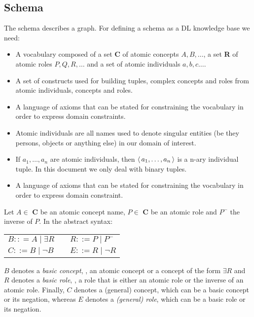\subsection{Schema}

The schema describes a graph. For defining a schema as a DL knowledge base we need:

\begin{itemize}
\item  A vocabulary composed of a set  \textbf{C} of atomic concepts $A, B, \dots$,
a set \textbf{R} of atomic roles $P, Q, R, \dots$ and a set of atomic individuals $a, b, c \dots$.


\item A set of constructs  used for building  tuples, complex concepts and roles  from atomic individuals, concepts and roles.
\item A language of axioms that can be stated for constraining  the vocabulary  in order to express domain constraints.

\item Atomic individuals are all names used to denote
singular entities (be they persons, objects or anything else) in our
domain of interest. 

\item If $a_1, \dots, a_n$ are atomic individuals, then $\tuple{a_1, \dots, a_n} $ is a n-ary individual tuple. In this document we only deal with binary tuples.

\item A language of axioms 
that can be stated for constraining the vocabulary in order to
express domain constraint.

\end{itemize}



\begin{definition} 
Let $A \in$   \textbf{C} be an atomic concept name, 
$P \in $ \textbf{C} be an atomic role and $P^-$ the inverse of  $P$.
In  the abstract syntax:

\begin{center}
\begin{tabular}{lcl}
$ B :: =  A \mid \exists R$ 	&\hspace{1cm}		&$ R ::= P \mid P^-$\\
$C ::= B \mid \neg B$ 		& 							&$ E ::= R \mid \neg R$ \\
\end{tabular}
\end{center}

\noindent
 $B$ denotes a \textit{basic concept}, \ie,  an atomic concept or a concept of 
 the form $\exists R$ and $R$ denotes a \textit{basic role}, \ie, a role that is either an 
 atomic role or the inverse of an atomic role. 
  Finally, $C$ denotes a \textit{}(general) concept, which can be a basic concept or its negation, 
  whereas $E$ denotes a \textit{(general) role}, which can be a basic role or its negation.

\end{definition}


